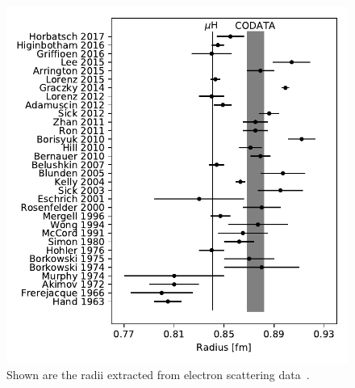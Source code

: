 \documentclass[10pt,superscriptaddress,aps,prc,twocolumn]{revtex4-1}
\begin{document}
\begin{figure}[htb]
\includegraphics[width=\columnwidth]{Figure/ScatteringResults.pdf}
\caption{Shown are the radii extracted from electron scattering 
data~\cite{Horbatsch:2016ilr,
Higinbotham:2015rja,
Griffioen:2015hta,
Lee:2015jqa,
Arrington:2015ria,
Graczyk:2014lba,
Lorenz:2014yda,Lorenz:2014vha,
Lorenz:2012tm,
Adamuscin:2012zz,
Sick:2012zz,
Zhan:2011ji,
Ron:2011rd,
Borisyuk:2009mg,
Hill:2010yb,
Bernauer:2010wm, Bernauer:2013tpr,
Belushkin:2006qa,
Blunden:2005jv,
Kelly:2004hm,
Sick:2003gm,
GoughEschrich:2001ji,
Rosenfelder:1999cd,
Mergell:1995bf,
Wong:1994sy,
McCord:1991sd,
Simon:1980hu,
Hohler:1976ax,
Borkowski:1975ume,
Borkowski:1974tm,Borkowski:1974mb,
Akimov:1972nu,
Murphy:1974zz,
Frerejacque:1965ic,
Hand:1963zz}.
}
\end{figure}
\end{document}
